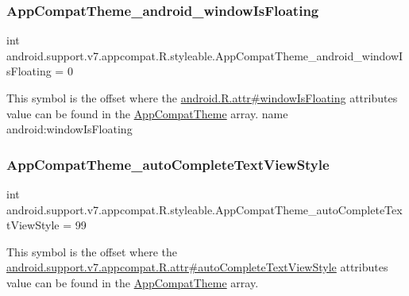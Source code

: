 \subsubsection{\texorpdfstring{App\+Compat\+Theme\+\_\+android\+\_\+window\+Is\+Floating}{AppCompatTheme\_android\_windowIsFloating}}
{\footnotesize\ttfamily int android.\+support.\+v7.\+appcompat.\+R.\+styleable.\+App\+Compat\+Theme\+\_\+android\+\_\+window\+Is\+Floating = 0\hspace{0.3cm}{\ttfamily [static]}}

This symbol is the offset where the \hyperlink{}{android.\+R.\+attr\#window\+Is\+Floating} attribute\textquotesingle{}s value can be found in the \hyperlink{classandroid_1_1support_1_1v7_1_1appcompat_1_1R_1_1styleable_a5c42f89e8a410c323be34208d75c430b}{App\+Compat\+Theme} array.  name android\+:window\+Is\+Floating \mbox{\label{classandroid_1_1support_1_1v7_1_1appcompat_1_1R_1_1styleable_ad197292c918a85fb914e559e9992c78a}} 
\subsubsection{\texorpdfstring{App\+Compat\+Theme\+\_\+auto\+Complete\+Text\+View\+Style}{AppCompatTheme\_autoCompleteTextViewStyle}}
{\footnotesize\ttfamily int android.\+support.\+v7.\+appcompat.\+R.\+styleable.\+App\+Compat\+Theme\+\_\+auto\+Complete\+Text\+View\+Style = 99\hspace{0.3cm}{\ttfamily [static]}}

This symbol is the offset where the \hyperlink{classandroid_1_1support_1_1v7_1_1appcompat_1_1R_1_1attr_a9c6adb855e4bb0ec184b8f3c903ac322}{android.\+support.\+v7.\+appcompat.\+R.\+attr\#auto\+Complete\+Text\+View\+Style} attribute\textquotesingle{}s value can be found in the \hyperlink{classandroid_1_1support_1_1v7_1_1appcompat_1_1R_1_1styleable_a5c42f89e8a410c323be34208d75c430b}{App\+Compat\+Theme} array.

